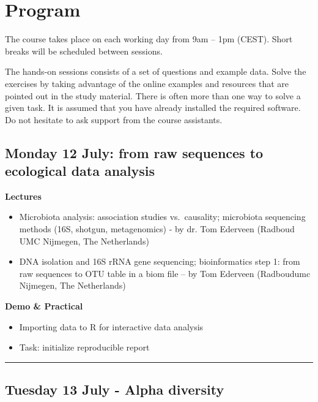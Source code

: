 \documentclass[
  oneside]{book}
\begin{document}
\hypertarget{program}{%
\chapter{Program}\label{program}}

The course takes place on each working day from 9am -- 1pm
(CEST). Short breaks will be scheduled between sessions.

The hands-on sessions consists of a set of questions and example
data. Solve the exercises by taking advantage of the online examples
and resources that are pointed out in the study material. There is
often more than one way to solve a given task. It is assumed that you
have already installed the required software. Do not hesitate to ask
support from the course assistants.

\hypertarget{monday-12-july-from-raw-sequences-to-ecological-data-analysis}{%
\section{Monday 12 July: from raw sequences to ecological data analysis}\label{monday-12-july-from-raw-sequences-to-ecological-data-analysis}}

\textbf{Lectures}

\begin{itemize}
\item
  Microbiota analysis: association studies vs.~causality; microbiota sequencing methods (16S, shotgun, metagenomics) - by dr. Tom Ederveen (Radboud UMC Nijmegen, The Netherlands)
\item
  DNA isolation and 16S rRNA gene sequencing; bioinformatics step 1: from raw sequences to OTU table in a biom file -- by Tom Ederveen (Radboudumc Nijmegen, The Netherlands)
\end{itemize}

\textbf{Demo \& Practical}

\begin{itemize}
\item
  Importing data to R for interactive data analysis
\item
  Task: initialize reproducible report
\end{itemize}

\begin{center}\rule{0.5\linewidth}{0.5pt}\end{center}

\hypertarget{tuesday-13-july---alpha-diversity}{%
\section{Tuesday 13 July - Alpha diversity}\label{tuesday-13-july---alpha-diversity}}
\end{document}
